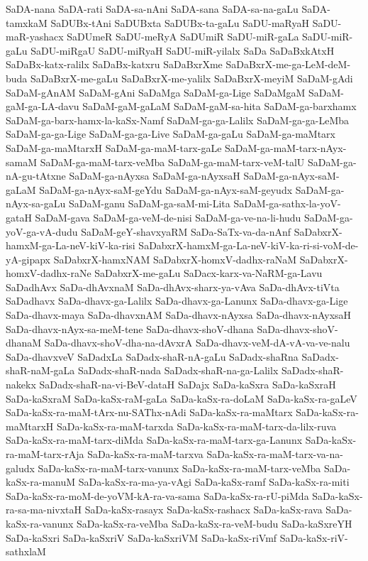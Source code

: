 {SaDA-nana
SaDA-rati
SaDA-sa-nAni
SaDA-sana
SaDA-sa-na-gaLu
SaDA-tamxkaM
SaDUBx-tAni
SaDUBxta
SaDUBx-ta-gaLu
SaDU-maRyaH
SaDU-maR-yashacx
SaDUmeR
SaDU-meRyA
SaDUmiR
SaDU-miR-gaLa
SaDU-miR-gaLu
SaDU-miRgaU
SaDU-miRyaH
SaDU-miR-yilalx
SaDa
SaDaBxkAtxH
SaDaBx-katx-ralilx
SaDaBx-katxru
SaDaBxrXme
SaDaBxrX-me-ga-LeM-deM-buda
SaDaBxrX-me-gaLu
SaDaBxrX-me-yalilx
SaDaBxrX-meyiM
SaDaM-gAdi
SaDaM-gAnAM
SaDaM-gAni
SaDaMga
SaDaM-ga-Lige
SaDaMgaM
SaDaM-gaM-ga-LA-davu
SaDaM-gaM-gaLaM
SaDaM-gaM-sa-hita
SaDaM-ga-barxhamx
SaDaM-ga-barx-hamx-la-kaSx-Namf
SaDaM-ga-ga-Lalilx
SaDaM-ga-ga-LeMba
SaDaM-ga-ga-Lige
SaDaM-ga-ga-Live
SaDaM-ga-gaLu
SaDaM-ga-maMtarx
SaDaM-ga-maMtarxH
SaDaM-ga-maM-tarx-gaLe
SaDaM-ga-maM-tarx-nAyx-samaM
SaDaM-ga-maM-tarx-veMba
SaDaM-ga-maM-tarx-veM-talU
SaDaM-ga-nA-gu-tAtxne
SaDaM-ga-nAyxsa
SaDaM-ga-nAyxsaH
SaDaM-ga-nAyx-saM-gaLaM
SaDaM-ga-nAyx-saM-geYdu
SaDaM-ga-nAyx-saM-geyudx
SaDaM-ga-nAyx-sa-gaLu
SaDaM-ganu
SaDaM-ga-saM-mi-Lita
SaDaM-ga-sathx-la-yoV-gataH
SaDaM-gava
SaDaM-ga-veM-de-nisi
SaDaM-ga-ve-na-li-hudu
SaDaM-ga-yoV-ga-vA-dudu
SaDaM-geY-shavxyaRM
SaDa-SaTx-va-da-nAnf
SaDabxrX-hamxM-ga-La-neV-kiV-ka-risi
SaDabxrX-hamxM-ga-La-neV-kiV-ka-ri-si-voM-de-yA-gipapx
SaDabxrX-hamxNAM
SaDabxrX-homxV-dadhx-raNaM
SaDabxrX-homxV-dadhx-raNe
SaDabxrX-me-gaLu
SaDacx-karx-va-NaRM-ga-Lavu
SaDadhAvx
SaDa-dhAvxnaM
SaDa-dhAvx-sharx-ya-vAva
SaDa-dhAvx-tiVta
SaDadhavx
SaDa-dhavx-ga-Lalilx
SaDa-dhavx-ga-Lanunx
SaDa-dhavx-ga-Lige
SaDa-dhavx-maya
SaDa-dhavxnAM
SaDa-dhavx-nAyxsa
SaDa-dhavx-nAyxsaH
SaDa-dhavx-nAyx-sa-meM-tene
SaDa-dhavx-shoV-dhana
SaDa-dhavx-shoV-dhanaM
SaDa-dhavx-shoV-dha-na-dAvxrA
SaDa-dhavx-veM-dA-vA-va-ve-nalu
SaDa-dhavxveV
SaDadxLa
SaDadx-shaR-nA-gaLu
SaDadx-shaRna
SaDadx-shaR-naM-gaLa
SaDadx-shaR-nada
SaDadx-shaR-na-ga-Lalilx
SaDadx-shaR-nakekx
SaDadx-shaR-na-vi-BeV-dataH
SaDajx
SaDa-kaSxra
SaDa-kaSxraH
SaDa-kaSxraM
SaDa-kaSx-raM-gaLa
SaDa-kaSx-ra-doLaM
SaDa-kaSx-ra-gaLeV
SaDa-kaSx-ra-maM-tArx-nu-SAThx-nAdi
SaDa-kaSx-ra-maMtarx
SaDa-kaSx-ra-maMtarxH
SaDa-kaSx-ra-maM-tarxda
SaDa-kaSx-ra-maM-tarx-da-lilx-ruva
SaDa-kaSx-ra-maM-tarx-diMda
SaDa-kaSx-ra-maM-tarx-ga-Lanunx
SaDa-kaSx-ra-maM-tarx-rAja
SaDa-kaSx-ra-maM-tarxva
SaDa-kaSx-ra-maM-tarx-va-na-galudx
SaDa-kaSx-ra-maM-tarx-vanunx
SaDa-kaSx-ra-maM-tarx-veMba
SaDa-kaSx-ra-manuM
SaDa-kaSx-ra-ma-ya-vAgi
SaDa-kaSx-ramf
SaDa-kaSx-ra-miti
SaDa-kaSx-ra-moM-de-yoVM-kA-ra-va-sama
SaDa-kaSx-ra-rU-piMda
SaDa-kaSx-ra-sa-ma-nivxtaH
SaDa-kaSx-rasayx
SaDa-kaSx-rashacx
SaDa-kaSx-rava
SaDa-kaSx-ra-vanunx
SaDa-kaSx-ra-veMba
SaDa-kaSx-ra-veM-budu
SaDa-kaSxreYH
SaDa-kaSxri
SaDa-kaSxriV
SaDa-kaSxriVM
SaDa-kaSx-riVmf
SaDa-kaSx-riV-sathxlaM
}
